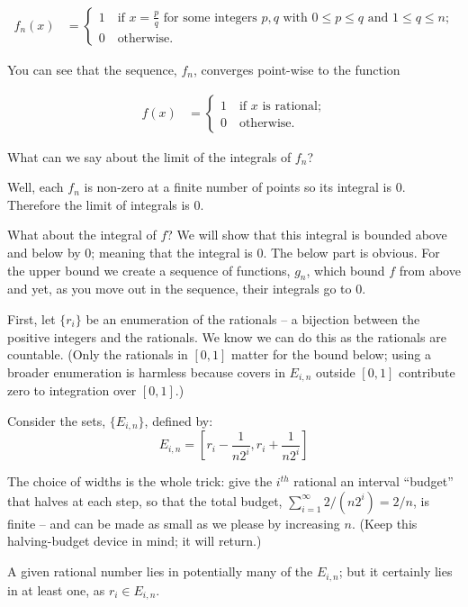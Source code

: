 \documentclass{article}
\begin{document}
\begin{align*}
	f_n(x) &= \begin{cases}  1 \quad \text{if $x = \frac{p}{q}$ for some integers $p, q$ with $0 \le p \le q$ and $1 \le q \le n$;} \\
	  			        		0 \quad \text{otherwise.}
			   	 \end{cases}
\end{align*}

You can see that the sequence, $f_n$, converges point-wise to the function 

\begin{align*}
	f(x) &= \begin{cases} 1 \quad \text{if $x$ is rational;} \\ 
			                 0 \quad \text{otherwise.} 
			   \end{cases}
\end{align*}

What can we say about the limit of the integrals of $f_n$?

Well, each $f_n$ is non-zero at a finite number of points so its integral is $0$.
Therefore the limit of integrals is $0$.

What about the integral of $f$? We will show that this integral is bounded above
and below by $0$; meaning that the integral is $0$. The below part is obvious. 
For the upper bound we create a sequence of functions, $g_n$, which bound $f$ 
from above and yet, as you move out in the sequence, their integrals go to $0$.

First, let $\{r_i\}$ be an enumeration of the rationals -- a bijection
between the positive integers and the rationals. We know we can do this as
the rationals are countable. (Only the
rationals in $[0,1]$ matter for the bound below; using a broader enumeration
is harmless because covers in $E_{i,n}$ outside $[0,1]$ contribute zero to
integration over $[0,1]$.)

Consider the sets, $\{E_{i,n}\}$, defined by:
\[
E_{i,n} = \left[r_i - \frac{1}{n 2^{i}}, r_i + \frac{1}{n 2^{i}}\right]
\]

The choice of widths is the whole trick: give the $i^{th}$ rational an
interval ``budget'' that halves at each step, so that the total budget,
$\sum_{i=1}^\infty 2/(n 2^{i}) = 2/n$, is finite -- and can be made as small
as we please by increasing $n$. (Keep this halving-budget device in mind; it
will return.)

A given rational number lies in potentially many of the $E_{i,n}$; but it
certainly lies in at least one, as $r_i \in E_{i,n}$.
\end{document}
